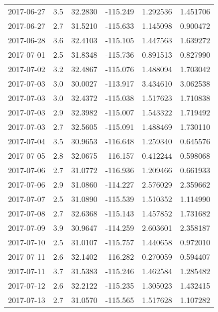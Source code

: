 \begin{tabular}{lrrrrr}
2017-06-27 &       3.5 &  32.2830 &  -115.249 &         1.292536 &         1.451706 \\
2017-06-27 &       2.7 &  31.5210 &  -115.633 &         1.145098 &         0.900472 \\
2017-06-28 &       3.6 &  32.4103 &  -115.105 &         1.447563 &         1.639272 \\
2017-07-01 &       2.5 &  31.8348 &  -115.736 &         0.891513 &         0.827990 \\
2017-07-02 &       3.2 &  32.4867 &  -115.076 &         1.488094 &         1.703042 \\
2017-07-03 &       3.0 &  30.0027 &  -113.917 &         3.434610 &         3.062538 \\
2017-07-03 &       3.0 &  32.4372 &  -115.038 &         1.517623 &         1.710838 \\
2017-07-03 &       2.9 &  32.3982 &  -115.007 &         1.543322 &         1.719492 \\
2017-07-03 &       2.7 &  32.5605 &  -115.091 &         1.488469 &         1.730110 \\
2017-07-04 &       3.5 &  30.9653 &  -116.648 &         1.259340 &         0.645576 \\
2017-07-05 &       2.8 &  32.0675 &  -116.157 &         0.412244 &         0.598068 \\
2017-07-06 &       2.7 &  31.0772 &  -116.936 &         1.209466 &         0.661933 \\
2017-07-06 &       2.9 &  31.0860 &  -114.227 &         2.576029 &         2.359662 \\
2017-07-07 &       2.5 &  31.0890 &  -115.539 &         1.510352 &         1.114990 \\
2017-07-08 &       2.7 &  32.6368 &  -115.143 &         1.457852 &         1.731682 \\
2017-07-09 &       3.9 &  30.9647 &  -114.259 &         2.603601 &         2.358187 \\
2017-07-10 &       2.5 &  31.0107 &  -115.757 &         1.440658 &         0.972010 \\
2017-07-11 &       2.6 &  32.1402 &  -116.282 &         0.270059 &         0.594407 \\
2017-07-11 &       3.7 &  31.5383 &  -115.246 &         1.462584 &         1.285482 \\
2017-07-12 &       2.6 &  32.2122 &  -115.235 &         1.305023 &         1.432415 \\
2017-07-13 &       2.7 &  31.0570 &  -115.565 &         1.517628 &         1.107282 \\

\end{tabular}
